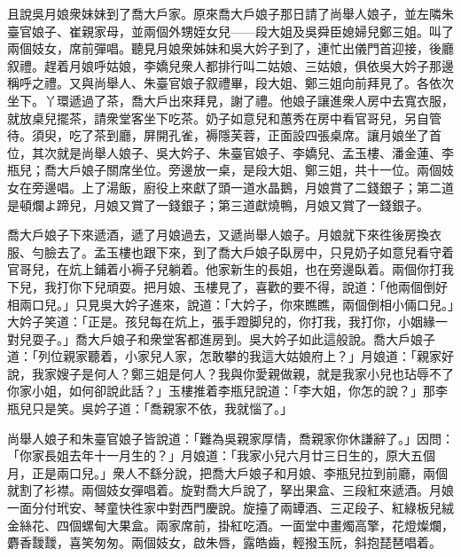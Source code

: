 且說吳月娘衆妹妹到了喬大戶家。原來喬大戶娘子那日請了尚舉人娘子，並左隣朱臺官娘子、崔親家母，並兩個外甥姪女兒——段大姐及吳舜臣媳婦兒鄭三姐。叫了兩個妓女，席前彈唱。聽見月娘衆姊妹和吳大妗子到了，連忙出儀門首迎接，後廳叙禮。趕着月娘呼姑娘，李嬌兒衆人都排行叫二姑娘、三姑娘，俱依吳大妗子那邊稱呼之禮。又與尚舉人、朱臺官娘子叙禮畢，段大姐、鄭三姐向前拜見了。各依次坐下。丫環遞過了茶，喬大戶出來拜見，謝了禮。他娘子讓進衆人房中去寬衣服，就放桌兒擺茶，請衆堂客坐下吃茶。奶子如意兒和蕙秀在房中看官哥兒，另自管待。須臾，吃了茶到廳，屏開孔雀，褥隱芙蓉，正面設四張桌席。讓月娘坐了首位，其次就是尚舉人娘子、吳大妗子、朱臺官娘子、李嬌兒、孟玉樓、潘金蓮、李瓶兒；喬大戶娘子關席坐位。旁邊放一桌，是段大姐、鄭三姐，共十一位。兩個妓女在旁邊唱。上了湯飯，廚役上來獻了頭一道水晶鵝，月娘賞了二錢銀子；第二道是頓爛よ蹄兒，月娘又賞了一錢銀子；第三道獻燒鴨，月娘又賞了一錢銀子。

喬大戶娘子下來遞酒，遞了月娘過去，又遞尚舉人娘子。月娘就下來徃後房換衣服、勻臉去了。孟玉樓也跟下來，到了喬大戶娘子臥房中，只見奶子如意兒看守着官哥兒，在炕上鋪着小褥子兒躺着。他家新生的長姐，也在旁邊臥着。兩個你打我下兒，我打你下兒頑耍。{}把月娘、玉樓見了，喜歡的要不得，說道：「他兩個倒好相兩口兒。」只見吳大妗子進來，說道：「大妗子，你來瞧瞧，兩個倒相小倆口兒。」大妗子笑道：「正是。孩兒每在炕上，張手蹬脚兒的，你打我，我打你，小姻緣一對兒耍子。」喬大戶娘子和衆堂客都進房到。吳大妗子如此這般說。喬大戶娘子道：「列位親家聽着，小家兒人家，怎敢攀的我這大姑娘府上？」月娘道：「親家好說，我家嫂子是何人？鄭三姐是何人？我與你愛親做親，就是我家小兒也玷辱不了你家小姐，如何卻說此話？」玉樓推着李瓶兒說道：「李大姐，你怎的說？」那李瓶兒只是笑。{}吳妗子道：「喬親家不依，我就惱了。」

尚舉人娘子和朱臺官娘子皆說道：「難為吳親家厚情，喬親家你休謙辭了。」因問：「你家長姐去年十一月生的？」月娘道：「我家小兒六月廿三日生的，原大五個月，正是兩口兒。」衆人不繇分說，把喬大戶娘子和月娘、李瓶兒拉到前廳，兩個就割了衫襟。兩個妓女彈唱着。旋對喬大戶說了，拏出果盒、三段紅來遞酒。月娘一面分付玳安、琴童快徃家中對西門慶說。旋擡了兩罈酒、三疋段子、紅綠板兒絨金絲花、四個螺甸大果盒。兩家席前，掛紅吃酒。一面堂中畫燭高擎，花燈燦爛，麝香靉靉，喜笑匆匆。兩個妓女，啟朱唇，露皓齒，輕撥玉阮，斜抱琵琶唱着。

